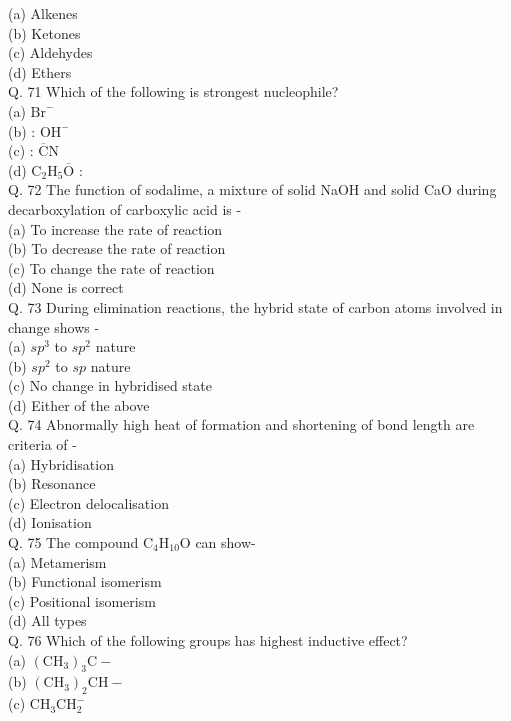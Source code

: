 \documentclass[10pt]{article}
\begin{document}
(a) Alkenes\\
(b) Ketones\\
(c) Aldehydes\\
(d) Ethers\\
Q. 71 Which of the following is strongest nucleophile?\\
(a) $\mathrm{Br}^{-}$\\
(b) : $\mathrm{OH}^{-}$\\
(c) : $\overline{\mathrm{C}} \mathrm{N}$\\
(d) $\mathrm{C}_{2} \mathrm{H}_{5} \overline{\mathrm{O}}$ :\\
Q. 72 The function of sodalime, a mixture of solid NaOH and solid CaO during decarboxylation of carboxylic acid is -\\
(a) To increase the rate of reaction\\
(b) To decrease the rate of reaction\\
(c) To change the rate of reaction\\
(d) None is correct\\
Q. 73 During elimination reactions, the hybrid state of carbon atoms involved in change shows -\\
(a) $s p^{3}$ to $s p^{2}$ nature\\
(b) $s p^{2}$ to $s p$ nature\\
(c) No change in hybridised state\\
(d) Either of the above\\
Q. 74 Abnormally high heat of formation and shortening of bond length are criteria of -\\
(a) Hybridisation\\
(b) Resonance\\
(c) Electron delocalisation\\
(d) Ionisation\\
Q. 75 The compound $\mathrm{C}_{4} \mathrm{H}_{10} \mathrm{O}$ can show-\\
(a) Metamerism\\
(b) Functional isomerism\\
(c) Positional isomerism\\
(d) All types\\
Q. 76 Which of the following groups has highest inductive effect?\\
(a) $\left(\mathrm{CH}_{3}\right)_{3} \mathrm{C}-$\\
(b) $\left(\mathrm{CH}_{3}\right)_{2} \mathrm{CH}-$\\
(c) $\mathrm{CH}_{3} \mathrm{CH}_{2}^{-}$\\
\end{document}
